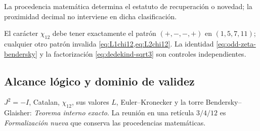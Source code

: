La procedencia matem\'atica determina el estatuto de recuperaci\'on o
novedad; la proximidad decimal no interviene en dicha clasificaci\'on.

\begin{remark}
El car\'acter \(\chi_{12}\) debe tener exactamente el patr\'on
\((+,-,-,+)\) en \((1,5,7,11)\); cualquier otro patr\'on invalida
\cref{eq:L1chi12,eq:L2chi12}. La identidad
\cref{eq:odd-zeta-bendersky} y la factorizaci\'on
\cref{eq:dedekind-sqrt3} son controles independientes.
\end{remark}

\subsection*{Alcance lógico y dominio de validez}
\(J^2=-I\), Catalan, \(\chi_{12}\), sus valores \(L\), Euler--Kronecker y la torre Bendersky--Glaisher: \emph{Teorema interno exacto}. La reuni\'on en una ret\'icula \(3/4/12\) es \emph{Formalizaci\'on nueva} que conserva las procedencias matemáticas.


